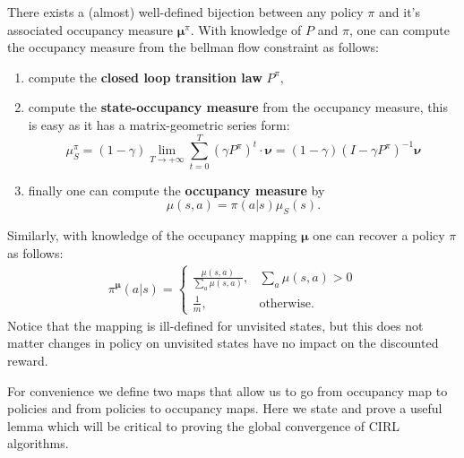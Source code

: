 \begin{observation}
    \label{obs:policy_occupancy_bijection}
    There exists a (almost) well-defined bijection between any policy $\pi$ and it's associated occupancy measure $\bm{\mu}^\pi$. With knowledge of $P$ and $\pi$, one can compute the occupancy measure from the bellman flow constraint as follows:
    \begin{enumerate}
        \item compute the \textbf{closed loop transition law} $P^\pi$,
        \item compute the \textbf{state-occupancy measure} from the occupancy measure, this is easy as it has a matrix-geometric series form:
        \[  \mu^\pi_S = (1-\gamma) \lim_{T \rightarrow + \infty} \sum_{t=0}^T  (\gamma P^\pi)^t \cdot \bm{\nu} = (1-\gamma) (I - \gamma P^\pi)^{-1} \bm{\nu}  \]
        \item finally one can compute the \textbf{occupancy measure} by
        \[ \mu(s,a) = \pi(a|s)\mu_S(s).\]
    \end{enumerate}
    Similarly, with knowledge of the occupancy mapping $\bm{\mu}$ one can recover a policy $\pi$ as follows:
    \begin{align*}
        \pi^{\bm{\mu}}(a|s)= \begin{cases}
            \frac{\mu(s,a)}{\sum_a\mu(s,a)}, &  \sum_a \mu(s,a) > 0\\
            \frac{1}{m}, & \text{otherwise}.
        \end{cases}
    \end{align*}
    Notice that the mapping is ill-defined for unvisited states, but this does not matter changes in policy on unvisited states have no impact on the discounted reward.
\end{observation}

For convenience we define two maps that allow us to go from occupancy map to policies and from policies to occupancy maps. Here we state and prove a useful lemma which will be critical to proving the global convergence of CIRL algorithms.


